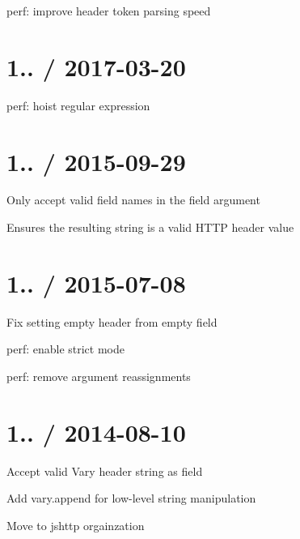 
\begin{DoxyItemize}
\item perf\+: improve header token parsing speed
\end{DoxyItemize}

\section*{1.. / 2017-\/03-\/20 }


\begin{DoxyItemize}
\item perf\+: hoist regular expression
\end{DoxyItemize}

\section*{1.. / 2015-\/09-\/29 }


\begin{DoxyItemize}
\item Only accept valid field names in the {\ttfamily field} argument
\begin{DoxyItemize}
\item Ensures the resulting string is a valid H\+T\+TP header value
\end{DoxyItemize}
\end{DoxyItemize}

\section*{1.. / 2015-\/07-\/08 }


\begin{DoxyItemize}
\item Fix setting empty header from empty {\ttfamily field}
\item perf\+: enable strict mode
\item perf\+: remove argument reassignments
\end{DoxyItemize}

\section*{1.. / 2014-\/08-\/10 }


\begin{DoxyItemize}
\item Accept valid {\ttfamily Vary} header string as {\ttfamily field}
\item Add {\ttfamily vary.\+append} for low-\/level string manipulation
\item Move to {\ttfamily jshttp} orgainzation
\end{DoxyItemize}

